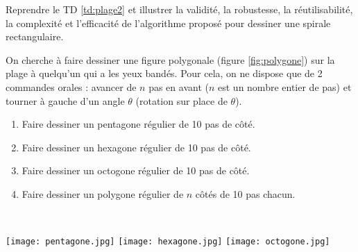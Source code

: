\begin{td}\label{td:plage4}
Reprendre le TD \ref{td:plage2} et illustrer la validité, la robustesse, 
la réutilisabilité, la complexité et l'efficacité de
l'algorithme proposé pour dessiner une spirale rectangulaire.
\end{td}


\begin{td}\label{td:tortue}
On cherche à faire dessiner une figure polygonale (figure \ref{fig:polygone}) 
sur la plage à quelqu'un qui a les yeux bandés.
Pour cela, on ne dispose que de 2 commandes orales :
avancer de $n$ pas en avant ($n$ est un nombre entier de pas) et 
tourner à gauche d'un angle $\theta$ (rotation sur place de $\theta$).
\begin{enumerate}
\item Faire dessiner un pentagone régulier de 10 pas de côté.
\item Faire dessiner un hexagone régulier de 10 pas de côté.
\item Faire dessiner un octogone régulier de 10 pas de côté.
\item Faire dessiner un polygone régulier de $n$ côtés de 10 pas chacun.
\end{enumerate}
\end{td}
\begin{fig}\label{fig:polygone}
\mbox{}\\
\centerline{
\texttt{[image: pentagone.jpg]}
\hfill
\texttt{[image: hexagone.jpg]}
\hfill
\texttt{[image: octogone.jpg]}
}
\end{fig}


